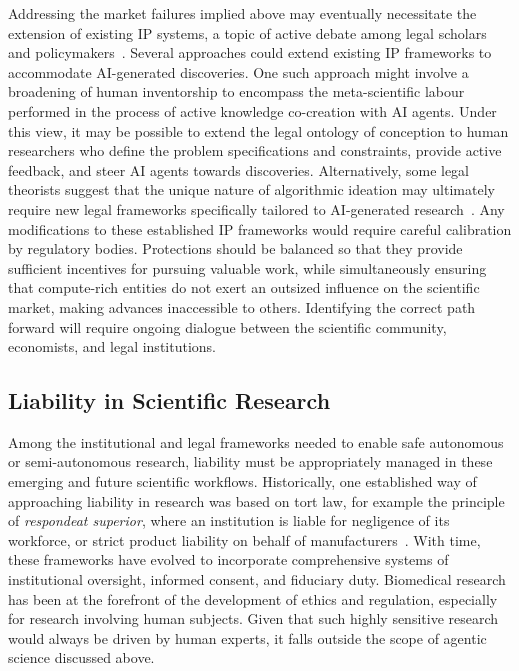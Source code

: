 \documentclass[11pt, a4paper, twocolumn, goog]{google}
\begin{document}
Addressing the market failures implied above may eventually necessitate the extension of existing IP systems, a topic of active debate among legal scholars and policymakers~\citep{davies2011evolutionary, lee2021artificial, picht2022artificial, cuntz2024artificial}. Several approaches could extend existing IP frameworks to accommodate AI-generated discoveries. One such approach might involve a broadening of human inventorship to encompass the meta-scientific labour performed in the process of active knowledge co-creation with AI agents. Under this view, it may be possible to extend the legal ontology of conception to human researchers who define the problem specifications and constraints, provide active feedback, and steer AI agents towards discoveries. Alternatively, some legal theorists suggest that the unique nature of algorithmic ideation may ultimately require new legal frameworks specifically tailored to AI-generated research~\citep{dornis2020artificial, massadeh2024legal}. Any modifications to these established IP frameworks would require careful calibration by regulatory bodies. Protections should be balanced so that they provide sufficient incentives for pursuing valuable work, while simultaneously ensuring that compute-rich entities do not exert an outsized influence on the scientific market, making advances inaccessible to others. Identifying the correct path forward will require ongoing dialogue between the scientific community, economists, and legal institutions.

\subsection{Liability in Scientific Research}

Among the institutional and legal frameworks needed to enable safe autonomous or semi-autonomous research, liability must be appropriately managed in these emerging and future scientific workflows. Historically, one established way of approaching liability in research was based on tort law, for example the principle of \emph{respondeat superior}, where an institution is liable for negligence of its workforce, or strict product liability on behalf of manufacturers~\citep{priest1985invention, van2020revival, abbott2020reasonable, shenoy2021respondeat}. With time, these frameworks have evolved to incorporate comprehensive systems of institutional oversight, informed consent, and fiduciary duty. Biomedical research has been at the forefront of the development of ethics and regulation, especially for research involving human subjects. Given that such highly sensitive research would always be driven by human experts, it falls outside the scope of agentic science discussed above.
\end{document}
